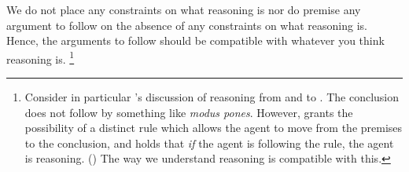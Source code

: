 \begin{note}
  We do not place any constraints on what reasoning is nor do premise any argument to follow on the absence of any constraints on what reasoning is.
  Hence, the arguments to follow should be compatible with whatever you think reasoning is.%
  \footnote{
    Consider in particular \citeauthor{Broome:2013aa}'s discussion of reasoning from  and  to .
    The conclusion does not follow by something like \emph{modus pones}.
    However, \citeauthor{Broome:2013aa} grants the possibility of a distinct rule which allows the agent to move from the premises to the conclusion, and holds that \emph{if} the agent is following the rule, the agent is reasoning.
    (\citeyear[233]{Broome:2013aa})
    The way we understand reasoning is compatible with this.
  }%




\end{note}


